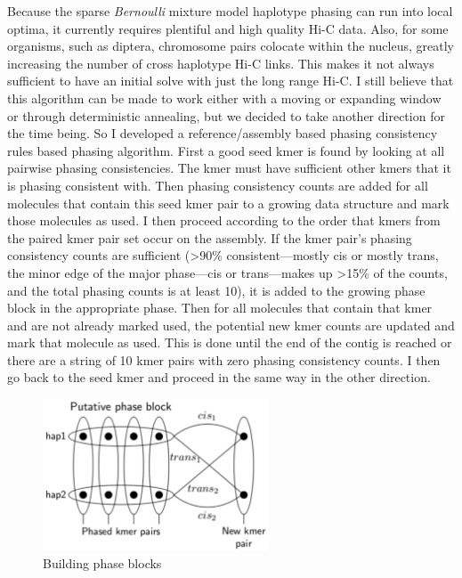 {\par{
Because the sparse \textit{Bernoulli} mixture model haplotype phasing can run into local optima, it currently requires plentiful and high quality Hi-C data. Also, for some organisms, such as diptera, chromosome pairs colocate within the nucleus\cite{somaticpairing}, greatly increasing the number of cross haplotype Hi-C links. This makes it not always sufficient to have an initial solve with just the long range Hi-C. I still believe that this algorithm can be made to work either with a moving or expanding window or through deterministic annealing, but we decided to take another direction for the time being. So I developed a reference/assembly based phasing consistency rules based phasing algorithm. First a good seed kmer is found by looking at all pairwise phasing consistencies. The kmer must have sufficient other kmers that it is phasing consistent with. Then phasing consistency counts are added for all molecules that contain this seed kmer pair to a growing data structure and mark those molecules as used. I then proceed according to the order that kmers from the paired kmer pair set occur on the assembly. If the kmer pair's phasing consistency counts are sufficient (>90\% consistent---mostly cis or mostly trans, the minor edge of the major phase---cis or trans---makes up >15\% of the counts, and the total phasing counts is at least 10), it is added to the growing phase block in the appropriate phase. Then for all molecules that contain that kmer and are not already marked used, the potential new kmer counts are updated and mark that molecule as used. This is done until the end of the contig is reached or there are a string of 10 kmer pairs with zero phasing consistency counts. I then go back to the seed kmer and proceed in the same way in the other direction.
}

\begin{figure}[htbp!]
\caption{Building phase blocks}
\label{figure:phaseblocks}
\begin{centering}
\includegraphics[width=0.6\textwidth]{phaseblockbuilding.png}
\end{centering}
\end{figure}

}
